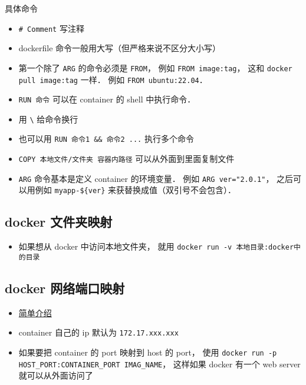 具体命令
\begin{itemize}
\item \verb|# Comment| 写注释
\item dockerfile 命令一般用大写（但严格来说不区分大小写）
\item 第一个除了 \verb|ARG| 的命令必须是 \verb|FROM|， 例如 \verb|FROM image:tag|， 这和 \verb|docker pull image:tag| 一样． 例如 \verb|FROM ubuntu:22.04|．
\item \verb|RUN 命令| 可以在 container 的 shell 中执行命令．
\item 用 \verb|\| 给命令换行
\item 也可以用 \verb|RUN 命令1 && 命令2 ...| 执行多个命令
\item \verb|COPY 本地文件/文件夹 容器内路径| 可以从外面到里面复制文件
\item \verb|ARG| 命令基本是定义 container 的环境变量． 例如 \verb|ARG ver="2.0.1"|， 之后可以用例如 \verb|myapp-${ver}| 来获替换成值（双引号不会包含）．
\end{itemize}


\subsection{docker 文件夹映射}
\begin{itemize}
\item 如果想从 docker 中访问本地文件夹， 就用 \verb|docker run -v 本地目录:docker中的目录|
\end{itemize}

\subsection{docker 网络端口映射}
\begin{itemize}
\item \href{https://www.freecodecamp.org/news/how-to-get-a-docker-container-ip-address-explained-with-examples/}{简单介绍}
\item container 自己的 ip 默认为 \verb`172.17.xxx.xxx`
\item 如果要把 container 的 port 映射到 host 的 port， 使用 \verb`docker run -p HOST_PORT:CONTAINER_PORT IMAG_NAME`， 这样如果 docker 有一个 web server 就可以从外面访问了
\end{itemize}

